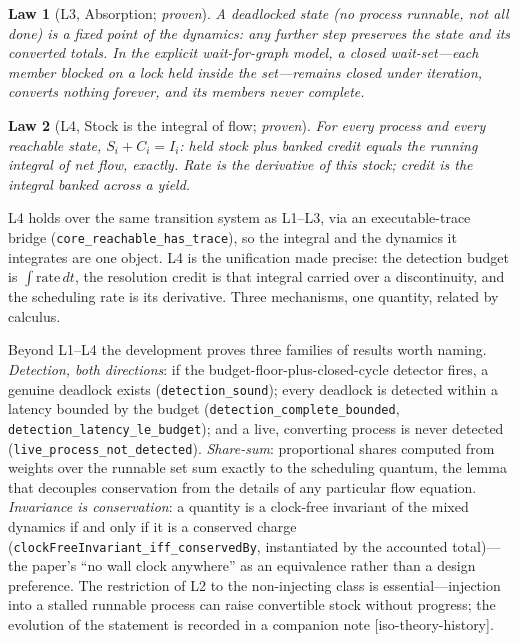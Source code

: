 \documentclass[11pt]{article}
\newtheorem{law}{Law}
\begin{document}
\begin{law}[L3, Absorption; \emph{proven}]
A deadlocked state (no process runnable, not all done) is a fixed point
of the dynamics: any further step preserves the state and its converted
totals. In the explicit wait-for-graph model, a closed wait-set---each
member blocked on a lock held inside the set---remains closed under
iteration, converts nothing forever, and its members never complete.
\end{law}

\begin{law}[L4, Stock is the integral of flow; \emph{proven}]
For every process and every reachable state,
$S_i + C_i = I_i$: held stock plus banked credit equals the running
integral of net flow, exactly. Rate is the derivative of this stock;
credit is the integral banked across a yield.
\end{law}

L4 holds over the same transition system as L1--L3, via an
executable-trace bridge (\texttt{core\_reachable\_has\_trace}), so the
integral and the dynamics it integrates are one object. L4 is the
unification made precise: the detection budget is
$\int \mathrm{rate}\,dt$, the resolution credit is that integral
carried over a discontinuity, and the scheduling rate is its
derivative. Three mechanisms, one quantity, related by calculus.

Beyond L1--L4 the development proves three families of results worth
naming. \emph{Detection, both directions}: if the
budget-floor-plus-closed-cycle detector fires, a genuine deadlock
exists (\texttt{detection\_sound}); every deadlock is detected within
a latency bounded by the budget
(\texttt{detection\_complete\_bounded},
\texttt{detection\_latency\_le\_budget}); and a live, converting
process is never detected (\texttt{live\_process\_not\_detected}).
\emph{Share-sum}: proportional shares computed from weights over the
runnable set sum exactly to the scheduling quantum, the lemma that
decouples conservation from the details of any particular flow
equation. \emph{Invariance is conservation}: a quantity is a
clock-free invariant of the mixed dynamics if and only if it is a
conserved charge (\texttt{clockFreeInvariant\_iff\_conservedBy},
instantiated by the accounted total)---the paper's ``no wall clock
anywhere'' as an equivalence rather than a design preference. The restriction of L2 to the non-injecting class is
essential---injection into a stalled runnable process can raise
convertible stock without progress; the evolution of the statement is
recorded in a companion note [iso-theory-history].
\end{document}
